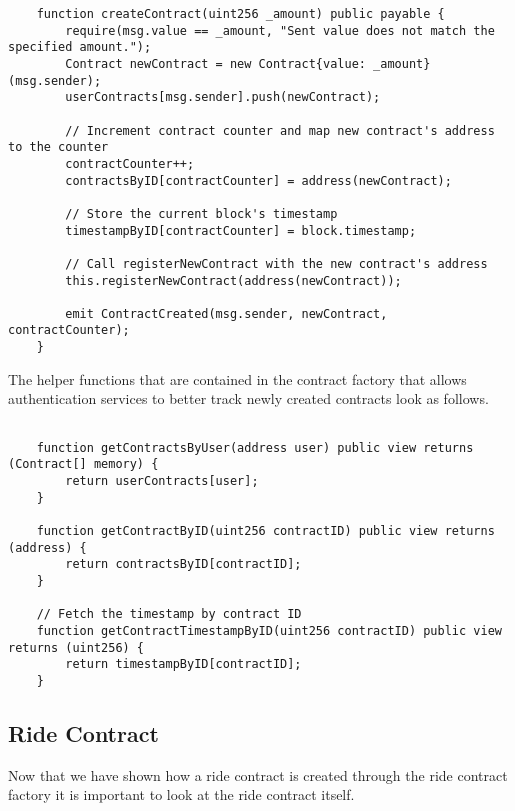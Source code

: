 \lstset{
  basicstyle=\footnotesize\ttfamily,
  breaklines=true,
  numbers=left,
  firstnumber=39,
}

\begin{lstlisting}
    function createContract(uint256 _amount) public payable {
        require(msg.value == _amount, "Sent value does not match the specified amount.");
        Contract newContract = new Contract{value: _amount}(msg.sender);
        userContracts[msg.sender].push(newContract);

        // Increment contract counter and map new contract's address to the counter
        contractCounter++;
        contractsByID[contractCounter] = address(newContract);
        
        // Store the current block's timestamp
        timestampByID[contractCounter] = block.timestamp;

        // Call registerNewContract with the new contract's address
        this.registerNewContract(address(newContract));

        emit ContractCreated(msg.sender, newContract, contractCounter);
    }
\end{lstlisting}
The helper functions that are contained in the contract factory that allows authentication services to better track newly created contracts look as follows.

\lstset{
  basicstyle=\footnotesize\ttfamily,
  breaklines=true,
  numbers=left,
  firstnumber=57
}

\begin{lstlisting}

    function getContractsByUser(address user) public view returns (Contract[] memory) {
        return userContracts[user];
    }

    function getContractByID(uint256 contractID) public view returns (address) {
        return contractsByID[contractID];
    }

    // Fetch the timestamp by contract ID
    function getContractTimestampByID(uint256 contractID) public view returns (uint256) {
        return timestampByID[contractID];
    }

\end{lstlisting}




\subsection{Ride Contract}
Now that we have shown how a ride contract is created through the ride contract factory it is important to look at the ride contract itself.


